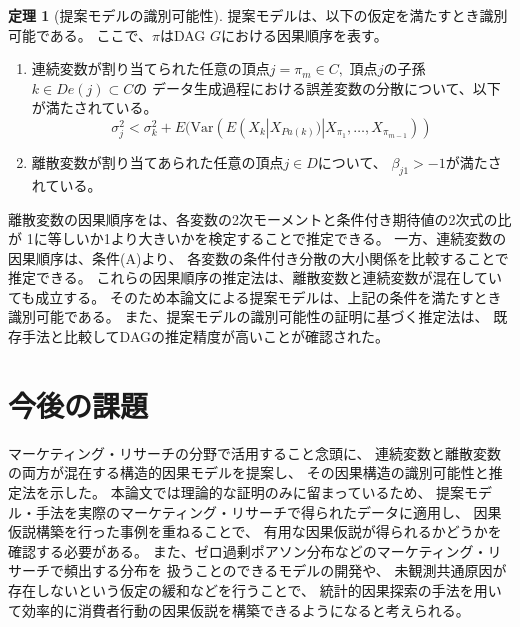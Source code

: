 \documentclass[uplatex]{jsarticle}
\theoremstyle{definition}
\newtheorem{theo}[df]{定理}
\begin{document}
\begin{theo}[提案モデルの識別可能性]
  提案モデルは、以下の仮定を満たすとき識別可能である。
  ここで、$\pi$はDAG $G$における因果順序を表す。
  \begin{enumerate}[label=(\Alph*)]
    \item
    連続変数が割り当てられた任意の頂点$j = \pi_m \in C,$ 頂点$j$の子孫$k \in De(j) \subset C$の
    データ生成過程における誤差変数の分散について、以下が満たされている。
    \begin{equation*}
      \sigma_j^2 < \sigma_k^2 + E(\mathrm{Var}(E(X_k | X_{Pa(k)}) | X_{\pi_1}, \dots, X_{\pi_{m-1}}))
    \end{equation*}

    \item
    離散変数が割り当てあられた任意の頂点$j \in D$について、
    $\beta_{j1} > -1$が満たされている。
  \end{enumerate}
\end{theo}

離散変数の因果順序をは、各変数の2次モーメントと条件付き期待値の2次式の比が
1に等しいか1より大きいかを検定することで推定できる。
一方、連続変数の因果順序は、条件(A)より、
各変数の条件付き分散の大小関係を比較することで推定できる。
これらの因果順序の推定法は、離散変数と連続変数が混在していても成立する。
そのため本論文による提案モデルは、上記の条件を満たすとき識別可能である。
また、提案モデルの識別可能性の証明に基づく推定法は、
既存手法と比較してDAGの推定精度が高いことが確認された。

\section{今後の課題}
マーケティング・リサーチの分野で活用すること念頭に、
連続変数と離散変数の両方が混在する構造的因果モデルを提案し、
その因果構造の識別可能性と推定法を示した。
本論文では理論的な証明のみに留まっているため、
提案モデル・手法を実際のマーケティング・リサーチで得られたデータに適用し、
因果仮説構築を行った事例を重ねることで、
有用な因果仮説が得られるかどうかを確認する必要がある。
また、ゼロ過剰ポアソン分布などのマーケティング・リサーチで頻出する分布を
扱うことのできるモデルの開発や、
未観測共通原因が存在しないという仮定の緩和などを行うことで、
統計的因果探索の手法を用いて効率的に消費者行動の因果仮説を構築できるようになると考えられる。




\end{document}
